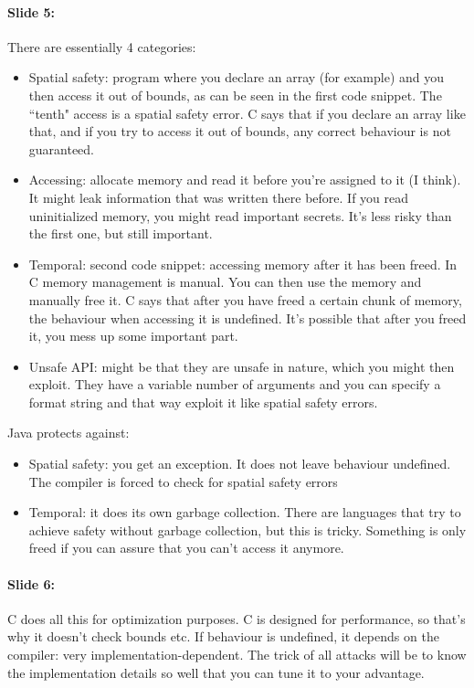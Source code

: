 \documentclass[10pt,a4paper]{report}
\begin{document}
\paragraph{Slide 5:} There are essentially 4 categories:
\begin{itemize}
\item Spatial safety: program where you declare an array (for example) and you then access it out of bounds, as can be seen in the first code snippet. The ``tenth" access is a spatial safety error. C says that if you declare an array like that, and if you try to access it out of bounds, any correct behaviour is not guaranteed.
\item Accessing: allocate memory and read it before you're assigned to it (I think). It might leak information that was written there before. If you read uninitialized memory, you might read important secrets. It's less risky than the first one, but still important.
\item Temporal: second code snippet: accessing memory after it has been freed. In C memory management is manual. You can then use the memory and manually free it. C says that after you have freed a certain chunk of memory, the behaviour when accessing it is undefined. It's possible that after you freed it, you mess up some important part.
\item Unsafe API: might be that they are unsafe in nature, which you might then exploit. They have a variable number of arguments and you can specify a format string and that way exploit it like spatial safety errors.
\end{itemize}
Java protects against:
\begin{itemize}
\item Spatial safety: you get an exception. It does not leave behaviour undefined. The compiler is forced to check for spatial safety errors
\item Temporal: it does its own garbage collection. There are languages that try to achieve safety without garbage collection, but this is tricky. Something is only freed if you can assure that you can't access it anymore.
\end{itemize}

\paragraph{Slide 6:} C does all this for optimization purposes. C is designed for performance, so that's why it doesn't check bounds etc. If behaviour is undefined, it depends on the compiler: very implementation-dependent. The trick of all attacks will be to know the implementation details so well that you can tune it to your advantage.
\end{document}
